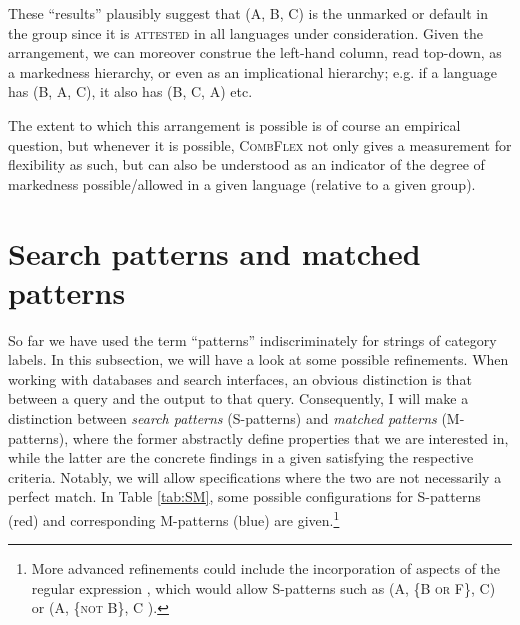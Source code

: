 \documentclass[output=paper,colorlinks,citecolor=brown,draft]{langscibook}
\begin{document}
These ``results''  plausibly suggest that (A, B, C) is the unmarked or default  in the  group since it is \textsc{attested} in all languages under consideration. Given the arrangement, we can moreover construe the left-hand column, read top-down, as a markedness hierarchy, or even as an implicational hierarchy; e.g. if a language has (B, A, C), it also has (B, C, A) etc. %

The extent to which this arrangement is possible is of course an empirical question, but whenever it is possible, \textsc{CombFlex} not only gives a measurement for flexibility as such, but can also be understood as an indicator of the degree of markedness possible/allowed in a given language (relative to a given  group). \\ %



\section{Search patterns and matched patterns}
\label{sec:SMpat}

So far we have used the term ``patterns'' indiscriminately for strings of category labels. In this subsection, we will have a look at some possible refinements. When working with databases and search interfaces, an obvious distinction is that between a query and the output to that query. Consequently, I will make a distinction between \textit{search patterns} (S-patterns) and \textit{matched patterns} (M-patterns), where the former abstractly define properties that we are interested in, while the latter are the concrete findings in a given  satisfying the respective criteria. Notably, we will allow specifications where the two are not necessarily a perfect match. 
In Table \ref{tab:SM}, some possible configurations for S-patterns (red) and corresponding M-patterns (blue) are given.\footnote{\label{regex}More advanced refinements could include the incorporation of aspects of the regular expression , which would allow S-patterns such as (A, \{\textsc{B or F}\}, C) or (A, \{\textsc{not B}\}, C ). } 
\end{document}
